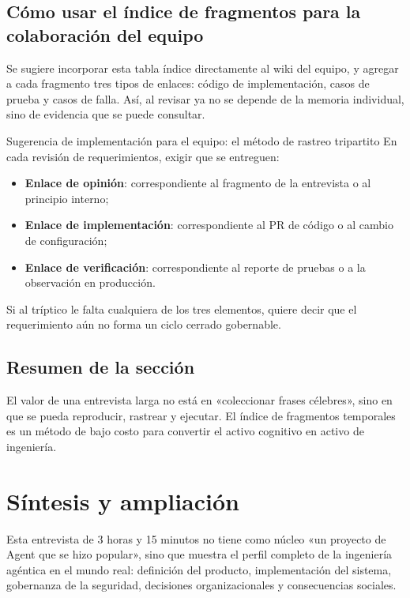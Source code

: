 \documentclass[a4paper]{article}
\begin{document}
\subsection{Cómo usar el índice de fragmentos para la colaboración del equipo}

Se sugiere incorporar esta tabla índice directamente al wiki del equipo, y agregar a cada fragmento tres tipos de enlaces: código de implementación, casos de prueba y casos de falla. Así, al revisar ya no se depende de la memoria individual, sino de evidencia que se puede consultar.

\begin{importantbox}{Sugerencia de implementación para el equipo: el método de rastreo tripartito}
En cada revisión de requerimientos, exigir que se entreguen:
\begin{itemize}
    \item \textbf{Enlace de opinión}: correspondiente al fragmento de la entrevista o al principio interno;
    \item \textbf{Enlace de implementación}: correspondiente al PR de código o al cambio de configuración;
    \item \textbf{Enlace de verificación}: correspondiente al reporte de pruebas o a la observación en producción.
\end{itemize}
Si al tríptico le falta cualquiera de los tres elementos, quiere decir que el requerimiento aún no forma un ciclo cerrado gobernable.
\end{importantbox}

\subsection{Resumen de la sección}
El valor de una entrevista larga no está en «coleccionar frases célebres», sino en que se pueda reproducir, rastrear y ejecutar. El índice de fragmentos temporales es un método de bajo costo para convertir el activo cognitivo en activo de ingeniería.

\section{Síntesis y ampliación}

Esta entrevista de 3 horas y 15 minutos no tiene como núcleo «un proyecto de Agent que se hizo popular», sino que muestra el perfil completo de la ingeniería agéntica en el mundo real: definición del producto, implementación del sistema, gobernanza de la seguridad, decisiones organizacionales y consecuencias sociales.
\end{document}
